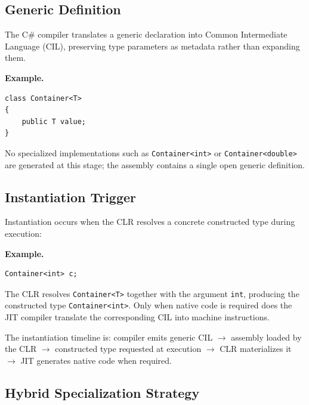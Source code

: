 \documentclass[11pt]{report}
\begin{document}
\subsection{Generic Definition}

The C\# compiler translates a generic declaration into Common Intermediate
Language (CIL), preserving type parameters as metadata rather than expanding
them.

\begin{examplebox}
\textbf{Example.}

\begin{lstlisting}[language=CSharp]
class Container<T>
{
    public T value;
}
\end{lstlisting}
No specialized implementations such as \texttt{Container<int>} or
\texttt{Container<double>} are generated at this stage; the assembly
contains a single open generic definition.
\end{examplebox}




\subsection{Instantiation Trigger}

Instantiation occurs when the CLR resolves a concrete constructed type
during execution:

\begin{examplebox}
\textbf{Example.}
\begin{lstlisting}[language=CSharp]
Container<int> c;
\end{lstlisting}
The CLR resolves \texttt{Container<T>} together with the argument
\texttt{int}, producing the constructed type \texttt{Container<int>}. Only
when native code is required does the JIT compiler translate the
corresponding CIL into machine instructions.
\end{examplebox}

The instantiation timeline is: compiler emits generic CIL $\rightarrow$
assembly loaded by the CLR $\rightarrow$ constructed type requested at
execution $\rightarrow$ CLR materializes it $\rightarrow$ JIT generates
native code when required.


\subsection{Hybrid Specialization Strategy}
\end{document}
